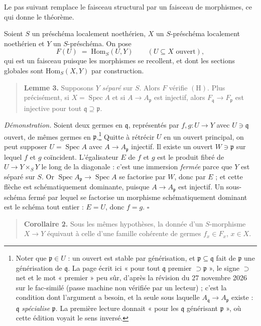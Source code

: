 \documentclass[11pt,a4paper]{article}
\begin{document}
Le pas suivant remplace le faisceau structural par un faisceau de morphismes,
ce qui donne le théorème.

Soient $S$ un préschéma localement noethérien, $X$ un $S$-préschéma
localement noethérien et $Y$ un $S$-préschéma. On pose
\[ F(U) \;=\; \mathrm{Hom}_S(U, Y) \qquad (U \subseteq X \text{ ouvert}), \]
qui est un faisceau puisque les morphismes se recollent, et dont les sections
globales sont $\mathrm{Hom}_S(X, Y)$ par construction.

\begin{quote}
\textbf{Lemme 3.} Supposons $Y$ \emph{séparé} sur $S$. Alors $F$ vérifie
$(\mathrm{H})$. Plus précisément, si $X = \operatorname{Spec} A$ et si
$A \to A_{\mathfrak p}$ est injectif, alors $F_{\mathfrak q} \to
F_{\mathfrak p}$ est injective pour tout $\mathfrak q \supseteq \mathfrak p$.
\end{quote}

\emph{Démonstration.} Soient deux germes en $\mathfrak q$, représentés par
$f, g : U \to Y$ avec $U \ni \mathfrak q$ ouvert, de mêmes germes en
$\mathfrak p$.\footnote{Noter que $\mathfrak p \in U$ : un ouvert est stable
par générisation, et $\mathfrak p \subseteq \mathfrak q$ fait de $\mathfrak p$
une générisation de $\mathfrak q$. La page écrit ici « pour tout $\mathfrak q$
premier $\supset \mathfrak p$ », le signe $\supset$ net et le mot « premier »
peu sûr, d'après la révision du 27 novembre 2026 sur le fac-similé (passe
machine non vérifiée par un lecteur) ; c'est la condition dont l'argument a
besoin, et la seule sous laquelle $A_{\mathfrak q} \to A_{\mathfrak p}$
existe : $\mathfrak q$ \emph{spécialise} $\mathfrak p$. La première lecture
donnait « pour les $\mathfrak q$ générisant $\mathfrak p$ », où cette édition
voyait le sens inversé.} Quitte à
rétrécir $U$ en un ouvert principal, on peut supposer $U = \operatorname{Spec}
A$ avec $A \to A_{\mathfrak p}$ injectif. Il existe un ouvert $W \ni
\mathfrak p$ sur lequel $f$ et $g$ coïncident. L'égalisateur $E$ de $f$ et $g$
est le produit fibré de $U \to Y \times_S Y$ le long de la diagonale : c'est
une immersion \emph{fermée} parce que $Y$ est séparé sur $S$. Or
$\operatorname{Spec} A_{\mathfrak p} \to \operatorname{Spec} A$ se factorise
par $W$, donc par $E$ ; et cette flèche est schématiquement dominante, puisque
$A \to A_{\mathfrak p}$ est injectif. Un sous-schéma fermé par lequel se
factorise un morphisme schématiquement dominant est le schéma tout entier :
$E = U$, donc $f = g$. $\square$

\begin{quote}
\textbf{Corollaire 2.} Sous les mêmes hypothèses, la donnée d'un
$S$-morphisme $X \to Y$ équivaut à celle d'une famille cohérente de germes
$f_x \in F_x$, $x \in X$.
\end{quote}
\end{document}
